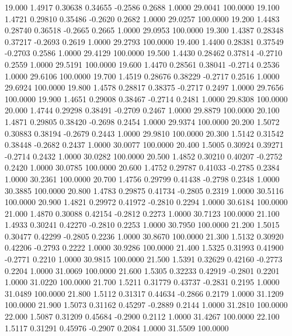   19.000   1.4917   0.30638   0.34655  -0.2586   0.2688   1.0000  29.0041 100.0000
  19.100   1.4721   0.29810   0.35486  -0.2620   0.2682   1.0000  29.0257 100.0000
  19.200   1.4483   0.28740   0.36518  -0.2665   0.2665   1.0000  29.0953 100.0000
  19.300   1.4387   0.28348   0.37217  -0.2693   0.2619   1.0000  29.2793 100.0000
  19.400   1.4400   0.28381   0.37549  -0.2703   0.2586   1.0000  29.4129 100.0000
  19.500   1.4430   0.28462   0.37814  -0.2710   0.2559   1.0000  29.5191 100.0000
  19.600   1.4470   0.28561   0.38041  -0.2714   0.2536   1.0000  29.6106 100.0000
  19.700   1.4519   0.28676   0.38229  -0.2717   0.2516   1.0000  29.6924 100.0000
  19.800   1.4578   0.28817   0.38375  -0.2717   0.2497   1.0000  29.7656 100.0000
  19.900   1.4651   0.29008   0.38467  -0.2714   0.2481   1.0000  29.8308 100.0000
  20.000   1.4744   0.29298   0.38491  -0.2709   0.2467   1.0000  29.8879 100.0000
  20.100   1.4871   0.29805   0.38420  -0.2698   0.2454   1.0000  29.9374 100.0000
  20.200   1.5072   0.30883   0.38194  -0.2679   0.2443   1.0000  29.9810 100.0000
  20.300   1.5142   0.31542   0.38448  -0.2682   0.2437   1.0000  30.0077 100.0000
  20.400   1.5005   0.30924   0.39271  -0.2714   0.2432   1.0000  30.0282 100.0000
  20.500   1.4852   0.30210   0.40207  -0.2752   0.2420   1.0000  30.0785 100.0000
  20.600   1.4752   0.29787   0.41033  -0.2785   0.2384   1.0000  30.2361 100.0000
  20.700   1.4756   0.29799   0.41438  -0.2798   0.2348   1.0000  30.3885 100.0000
  20.800   1.4783   0.29875   0.41734  -0.2805   0.2319   1.0000  30.5116 100.0000
  20.900   1.4821   0.29972   0.41972  -0.2810   0.2294   1.0000  30.6184 100.0000
  21.000   1.4870   0.30088   0.42154  -0.2812   0.2273   1.0000  30.7123 100.0000
  21.100   1.4933   0.30241   0.42270  -0.2810   0.2253   1.0000  30.7950 100.0000
  21.200   1.5015   0.30477   0.42299  -0.2805   0.2236   1.0000  30.8670 100.0000
  21.300   1.5132   0.30920   0.42206  -0.2793   0.2222   1.0000  30.9286 100.0000
  21.400   1.5325   0.31993   0.41900  -0.2771   0.2210   1.0000  30.9815 100.0000
  21.500   1.5391   0.32629   0.42160  -0.2773   0.2204   1.0000  31.0069 100.0000
  21.600   1.5305   0.32233   0.42919  -0.2801   0.2201   1.0000  31.0220 100.0000
  21.700   1.5211   0.31779   0.43737  -0.2831   0.2195   1.0000  31.0489 100.0000
  21.800   1.5112   0.31317   0.44634  -0.2866   0.2179   1.0000  31.1209 100.0000
  21.900   1.5073   0.31162   0.45297  -0.2889   0.2144   1.0000  31.2810 100.0000
  22.000   1.5087   0.31209   0.45684  -0.2900   0.2112   1.0000  31.4267 100.0000
  22.100   1.5117   0.31291   0.45976  -0.2907   0.2084   1.0000  31.5509 100.0000
